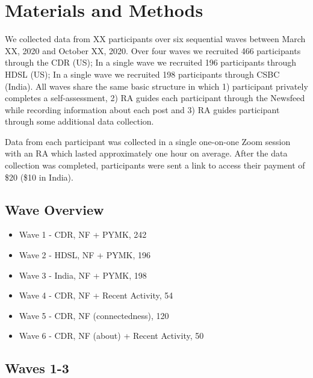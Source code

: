 \documentclass[12pt,letterpaper]{article}
\begin{document}
\FloatBarrier
\clearpage
\appendix
\renewcommand\thefigure{\thesection.\arabic{figure}}
\renewcommand\thetable{\thesection.\arabic{table}}


\section{Materials and Methods}\label{app:materials}

We collected data from XX participants over six sequential waves between March XX, 2020 and October XX, 2020. Over four waves we recruited 466 participants through the CDR (US); In a single wave we recruited 196 participants through HDSL (US); In a single wave we recruited 198 participants through CSBC (India). All waves share the same basic structure in which 1) participant privately completes a self-assessment, 2) RA guides each participant through the Newsfeed while recording information about each post and 3) RA guides participant through some additional data collection.

Data from each participant was collected in a single one-on-one Zoom session with an RA which lasted approximately one hour on average. After the data collection was completed, participants were sent a link to access their payment of \$20 (\$10 in India).

\subsection{Wave Overview}
\begin{itemize}
    \item Wave 1 - CDR, NF + PYMK, 242
    \item Wave 2 - HDSL, NF + PYMK, 196
    \item Wave 3 - India, NF + PYMK, 198
    \item Wave 4 - CDR, NF + Recent Activity, 54
    \item Wave 5 - CDR, NF (connectedness), 120
    \item Wave 6 - CDR, NF (about) + Recent Activity, 50
\end{itemize}

\subsection{Waves 1-3}
\end{document}
